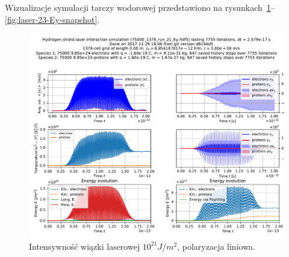 Wizualizacje symulacji tarczy wodorowej przedstawiono na rysunkach~\ref{fig:laser-21-Ey}--\ref{fig:laser-23-Ey-snapshot}.







\begin{figure}[h!]
  \includegraphics[width=\textwidth]{Images/75000_1378_run_21_Ey}
  \caption{Intensywność wiązki laserowej $10^{21} J/m^2$, polaryzacja liniowa.\label{fig:laser-21-Ey}}
\end{figure}

